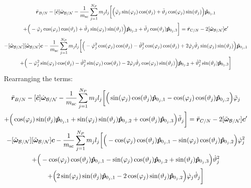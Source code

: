 \documentclass[]{BasiliskReportMemo}
\begin{document}
	\begin{multline}
	\ddot{\bm r}_{B/N}-[\tilde{\bm{c}}] \dot{\bm\omega}_{\cal B/N}-\frac{1}{m_{\text{sc}}}\sum_{j=1}^{N_{P}}m_j l_j \bigg[
	\Big(\ddot{\varphi}_j\sin(\varphi_j)\cos(\vartheta_j)+\ddot{\vartheta}_j\cos(\varphi_j)\sin(\vartheta_j)\Big)\bm{\hat{p}}_{0_j,1}\\ +\Big(-\ddot{\varphi}_j\cos(\varphi_j)\cos(\vartheta_j)+\ddot{\vartheta}_j\sin(\varphi_j)\sin(\vartheta_j)\Big)\bm{\hat{p}}_{0_j,2}+\ddot{\vartheta}_j\cos(\vartheta_j)\bm{\hat{p}}_{0_j,3}
	\bigg]= \ddot{\bm r}_{C/N} 	- 2[\tilde{\bm\omega}_{\cal B/N}] \bm c'
	\\
	-[\tilde{\bm\omega}_{\cal B/N}][\tilde{\bm\omega}_{\cal B/N}]\bm{c}
	-\frac{1}{m_{\text{sc}}}\sum_{j=1}^{N_{P}}m_j l_j \bigg[
	\Big(-\dot{\varphi}_j^2\cos(\varphi_j)\cos(\vartheta_j)-\dot{\vartheta}_j^2\cos(\varphi_j)\cos(\vartheta_j)+2\dot{\varphi}_j\dot{\vartheta}_j\sin(\varphi_j)\sin(\vartheta_j) \Big)\bm{\hat{p}}_{0_j,1} \\
	+\Big(-\dot{\varphi}_j^2\sin(\varphi_j)\cos(\vartheta_j)-\dot{\vartheta}_j^2\sin(\varphi_j)\cos(\vartheta_j)-2\dot{\varphi}_j\dot{\vartheta}_j\cos(\varphi_j)\sin(\vartheta_j) \Big)\bm{\hat{p}}_{0_j,2}
	+\dot{\vartheta}_j^2\sin(\vartheta_j)\bm{\hat{p}}_{0_j,3}
	\bigg]
	\label{eq:Rbddot3}
	\end{multline}
	Rearranging the terms:
	\begin{multline}
	\ddot{\bm r}_{B/N}-[\tilde{\bm{c}}] \dot{\bm\omega}_{\cal B/N}-\frac{1}{m_{\text{sc}}}\sum_{j=1}^{N_{P}}m_j l_j \bigg[
	\Big(\sin(\varphi_j)\cos(\vartheta_j)\bm{\hat{p}}_{0_j,1}-\cos(\varphi_j)\cos(\vartheta_j)\bm{\hat{p}}_{0_j,2}\Big)\ddot{\varphi}_j \\+\Big(\cos(\varphi_j)\sin(\vartheta_j)\bm{\hat{p}}_{0_j,1}+\sin(\varphi_j)\sin(\vartheta_j)\bm{\hat{p}}_{0_j,2}+\cos(\vartheta_j)\bm{\hat{p}}_{0_j,3}\Big)\ddot{\vartheta}_j
	\bigg]= \ddot{\bm r}_{C/N} 	- 2[\tilde{\bm\omega}_{\cal B/N}] \bm c'
	\\-[\tilde{\bm\omega}_{\cal B/N}][\tilde{\bm\omega}_{\cal B/N}]\bm{c}
	-\frac{1}{m_{\text{sc}}}\sum_{j=1}^{N_{P}}m_j l_j \bigg[
	\Big(-\cos(\varphi_j)\cos(\vartheta_j)\bm{\hat{p}}_{0_j,1}-\sin(\varphi_j)\cos(\vartheta_j)\bm{\hat{p}}_{0_j,2}\Big)\dot{\varphi}_j^2
	\\+\Big(-\cos(\varphi_j)\cos(\vartheta_j)\bm{\hat{p}}_{0_j,1}-\sin(\varphi_j)\cos(\vartheta_j)\bm{\hat{p}}_{0_j,2}+\sin(\vartheta_j)\bm{\hat{p}}_{0_j,3} \Big)\dot{\vartheta}_j^2 \\+
	\Big(2\sin(\varphi_j)\sin(\vartheta_j)\bm{\hat{p}}_{0_j,1} -2\cos(\varphi_j)\sin(\vartheta_j)\bm{\hat{p}}_{0_j,2}\Big)\dot{\varphi}_j\dot{\vartheta}_j
	\bigg]
	\label{eq:Rbddot4}
	\end{multline}
	
\end{document}
